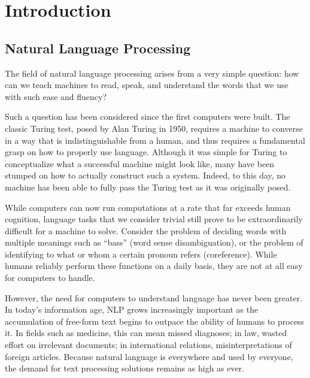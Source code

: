 \documentclass[12pt]{report}
\begin{document}
\tableofcontents{}

\listoffigures

\listoftables




\chapter{Introduction}


\section{Natural Language Processing}

The field of natural language processing arises from a very simple question: how can we teach machines to read, speak, and understand the words that we use with such ease and fluency?

Such a question has been considered since the first computers were built. The classic Turing test, posed by Alan Turing in 1950, requires a machine to converse in a way that is indistinguishable from a human, and thus requires a fundamental grasp on how to properly use language.
Although it was simple for Turing to conceptualize what a successful machine might look like, many have been stumped on how to actually construct such a system.
Indeed, to this day, no machine has been able to fully pass the Turing test as it was originally posed.


While computers can now run computations at a rate that far exceeds human cognition, language tasks that we consider trivial still prove to be extraordinarily difficult for a machine to solve. Consider the problem of deciding words with multiple meanings such as ``bass'' (word sense disambiguation), or the problem of identifying to what or whom a certain pronoun refers (coreference). 
While humans reliably perform these functions on a daily basis, they are not at all easy for computers to handle.


However, the need for computers to understand language has never been greater.
In today's information age, NLP grows increasingly important as the accumulation of free-form text begins to outpace the ability of humans to process it. In fields such as medicine, this can mean missed diagnoses; in law, wasted effort on irrelevant documents; in international relations, misinterpretations of foreign articles.
Because natural language is everywhere and used by everyone, the demand for text processing solutions remains as high as ever.
\end{document}
